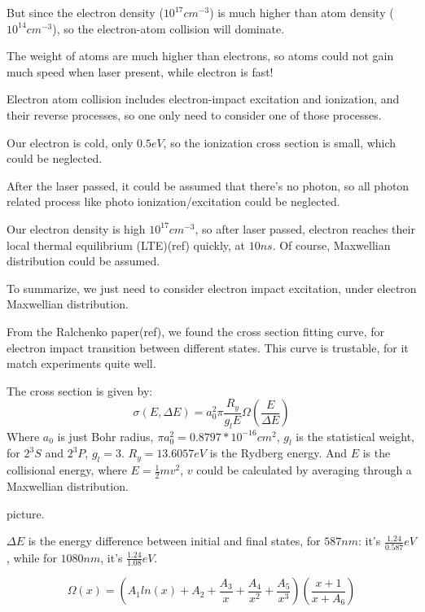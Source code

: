 But since the electron density ($10^{17}cm^{-3}$) is much higher than
atom density ($10^{14}cm^{-3}$), so the electron-atom collision will
dominate.

The weight of atoms are much higher than electrons, so atoms could not
gain much speed when laser present, while electron is fast!

Electron atom collision includes electron-impact excitation and
ionization, and their reverse processes, so one only need to consider
one of those processes.

Our electron is cold, only $0.5eV$, so the ionization cross section is
small, which could be neglected.

After the laser passed, it could be assumed that there's no photon, so
all photon related process like photo ionization/excitation could be
neglected.

Our electron density is high $10^{17}cm^{-3}$, so after laser passed,
electron reaches their local thermal equilibrium (LTE)(ref) quickly, at
$10ns$. Of course, Maxwellian distribution could be assumed.

To summarize, we just need to consider electron impact excitation,
under electron Maxwellian distribution.

From the Ralchenko paper(ref), we found the cross section fitting
curve, for electron impact transition between different states. This
curve is trustable, for it match experiments quite well.

The cross section is given by:
\begin{equation}
\sigma(E,\Delta E) = a_0^2 \pi \frac{R_y}{g_l E}
\Omega(\frac{E}{\Delta E})
\end{equation}
Where $a_0$ is just Bohr radius, $\pi a_0^2 = 0.8797 * 10^{-16} cm^2$,
$g_l$ is the statistical weight, for $2^3 S$ and $2^3 P$, $g_l = 3$.
$R_y = 13.6057 eV$ is the Rydberg energy. And $E$ is the collisional
energy, where $E=\frac{1}{2}mv^2$, $v$ could be calculated by
averaging through a Maxwellian distribution.

picture.

$\Delta E$ is the energy difference between initial and final states,
for $587nm$: it's $\frac{1.24}{0.587} eV$, while for $1080nm$, it's
$\frac{1.24}{1.08} eV$.

\begin{equation}
\Omega(x) = (A_1 ln(x) + A_2 + \frac{A_3}{x} + \frac{A_4}{x^2} +
\frac{A_5}{x^3}) (\frac{x+1}{x+A_6})
\end{equation}

